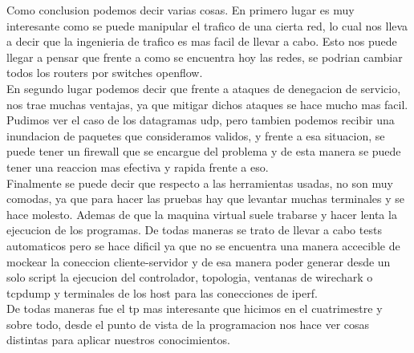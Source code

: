Como conclusion podemos decir varias cosas. En primero lugar es muy interesante como se puede manipular el trafico de una cierta red, lo cual nos lleva a decir que la ingenieria de trafico es mas facil de llevar a cabo. Esto nos puede llegar a pensar que frente a como se encuentra hoy las redes, se podrian cambiar todos los routers por switches openflow.\\
En segundo lugar podemos decir que frente a ataques de denegacion de servicio, nos trae muchas ventajas, ya que mitigar dichos ataques se hace mucho mas facil. Pudimos ver el caso de los datagramas udp, pero tambien podemos recibir una inundacion de paquetes que consideramos validos, y frente a esa situacion, se puede tener un firewall que se encargue del problema y de esta manera se puede tener una reaccion mas efectiva y rapida frente a eso.\\
Finalmente se puede decir que respecto a las herramientas usadas, no son muy comodas, ya que para hacer las pruebas hay que levantar muchas terminales y se hace molesto. Ademas de que la maquina virtual suele trabarse y hacer lenta la ejecucion de los programas. De todas maneras se trato de llevar a cabo tests automaticos pero se hace dificil ya que no se encuentra una manera accecible de mockear la coneccion cliente-servidor y de esa manera poder generar desde un solo script la ejecucion del controlador, topologia, ventanas de wirechark o tcpdump y terminales de los host para las conecciones de iperf. \\
De todas maneras fue el tp mas interesante que hicimos en el cuatrimestre y sobre todo, desde el punto de vista de la programacion nos hace ver cosas distintas para aplicar nuestros conocimientos.
